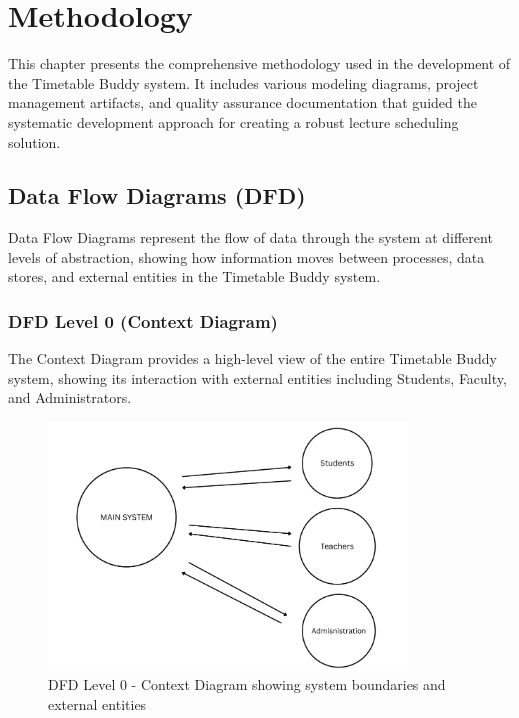\chapter{Methodology}

This chapter presents the comprehensive methodology used in the development of the Timetable Buddy system. It includes various modeling diagrams, project management artifacts, and quality assurance documentation that guided the systematic development approach for creating a robust lecture scheduling solution.

\section{Data Flow Diagrams (DFD)}

Data Flow Diagrams represent the flow of data through the system at different levels of abstraction, showing how information moves between processes, data stores, and external entities in the Timetable Buddy system.

\subsection{DFD Level 0 (Context Diagram)}

The Context Diagram provides a high-level view of the entire Timetable Buddy system, showing its interaction with external entities including Students, Faculty, and Administrators.

\begin{figure}[ht]
    \centering
    \includegraphics[width=0.85\textwidth]{images/DFD Level 0.png}
    \caption{DFD Level 0 - Context Diagram showing system boundaries and external entities}
    \label{fig:dfd0}
\end{figure}

